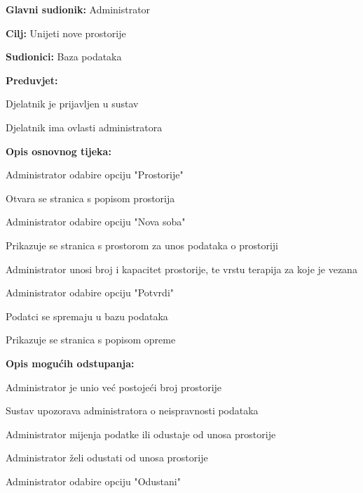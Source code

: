 				\noindent {}
				\begin{packed_item}
					
					\item \textbf{Glavni sudionik: }Administrator
					\item  \textbf{Cilj: }Unijeti nove prostorije
					\item  \textbf{Sudionici: }Baza podataka
					\item  \textbf{Preduvjet: }
					\item[] \begin{packed_enum}
						
						\item[-] Djelatnik je prijavljen u sustav
						\item[-] Djelatnik ima ovlasti administratora
					\end{packed_enum}
					\item  \textbf{Opis osnovnog tijeka: }
					
					\item[] \begin{packed_enum}
						\item Administrator odabire opciju "Prostorije"
						\item Otvara se stranica s popisom prostorija
						\item Administrator odabire opciju "Nova soba"
						\item Prikazuje se stranica s prostorom za unos podataka o prostoriji
						\item Administrator unosi broj i kapacitet prostorije, te vrstu terapija za koje je vezana
						\item Administrator odabire opciju "Potvrdi"
						\item Podatci se spremaju u bazu podataka
						\item Prikazuje se stranica s popisom opreme
					\end{packed_enum}
					
					\item  \textbf{Opis mogućih odstupanja:}
					
					\item[] \begin{packed_item}
						\item[6.a] Administrator je unio već postojeći broj prostorije
						\item[] \begin{packed_enum}
							\item Sustav upozorava administratora o neispravnosti podataka
							\item Administrator mijenja podatke ili odustaje od unosa prostorije
						\end{packed_enum}
						\item[6.b] Administrator želi odustati od unosa prostorije 
						\item[] \begin{packed_enum}
							\item Administrator odabire opciju "Odustani"
							\end{packed_enum}
					\end{packed_item}
				\end{packed_item}
				
